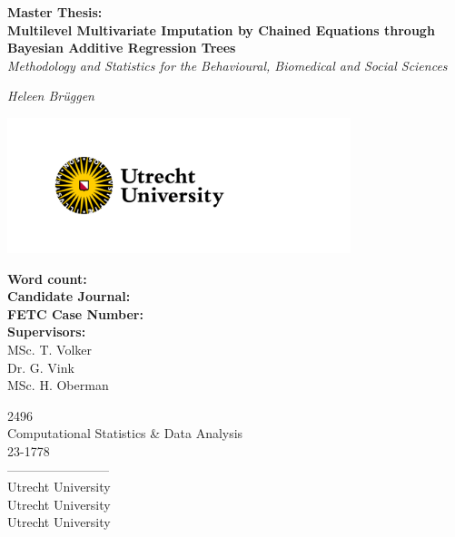 \documentclass[10pt, a4paper, titlepage]{article}
\begin{document}
\begin{titlingpage}
\begin{center}
\Huge\textbf{Master Thesis:  \\ Multilevel Multivariate Imputation by Chained Equations through Bayesian Additive Regression Trees} \\
\Large\textit{Methodology and Statistics for the Behavioural, Biomedical and Social Sciences}

\vspace{.5cm}

\normalsize\textit{Heleen Brüggen}

\vspace{11.5cm}

\begin{minipage}{.5\textwidth}
\begin{center}
        \includegraphics[width=10cm]{graphs/UU_logo_2021_EN_RGB.png}
\end{center}
\end{minipage}%

\vspace{.25cm}

\begin{minipage}{0.5\textwidth}
\begin{flushleft}

\textbf{Word count:} \\
\textbf{Candidate Journal:} \\
\textbf{FETC Case Number:} \\
\textbf{Supervisors:} \\
MSc. T. Volker \\
Dr. G. Vink \\
MSc. H. Oberman
\end{flushleft}
\end{minipage}%
\begin{minipage}{0.5\textwidth}
\begin{flushright}

2496 \\ %
Computational Statistics \& Data Analysis \\
23-1778 \\
------------------------\\
Utrecht University \\
Utrecht University \\
Utrecht University
\end{flushright}
\end{minipage}

\end{center}
\end{titlingpage}
\end{document}
